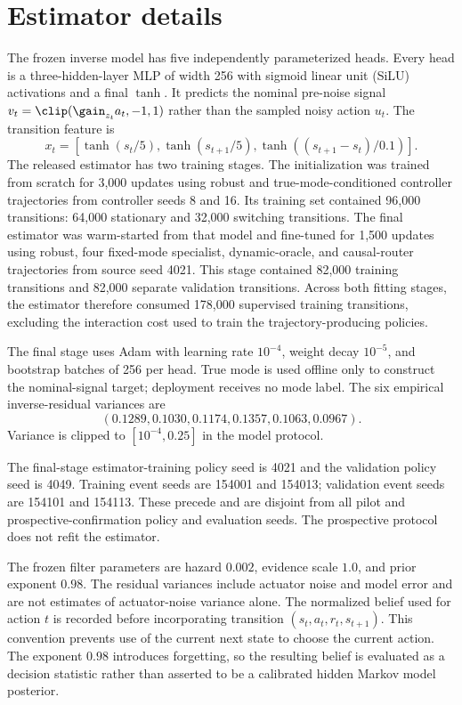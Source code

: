 \section{Estimator details}
\label{app:estimator}

The frozen inverse model has five independently parameterized heads. Every head is a three-hidden-layer MLP of width 256 with sigmoid linear unit (SiLU) activations and a final $\tanh$. It predicts the nominal pre-noise signal $v_t=\clip(\gain_{z_t}a_t,-1,1)$ rather than the sampled noisy action $u_t$. The transition feature is
\begin{equation}
    x_t=\left[
      \tanh(s_t/5),
      \tanh(s_{t+1}/5),
      \tanh((s_{t+1}-s_t)/0.1)
    \right].
\end{equation}
The released estimator has two training stages. The initialization was trained from scratch for 3,000 updates using robust and true-mode-conditioned controller trajectories from controller seeds 8 and 16. Its training set contained 96,000 transitions: 64,000 stationary and 32,000 switching transitions. The final estimator was warm-started from that model and fine-tuned for 1,500 updates using robust, four fixed-mode specialist, dynamic-oracle, and causal-router trajectories from source seed 4021. This stage contained 82,000 training transitions and 82,000 separate validation transitions. Across both fitting stages, the estimator therefore consumed 178,000 supervised training transitions, excluding the interaction cost used to train the trajectory-producing policies.

The final stage uses Adam with learning rate $10^{-4}$, weight decay $10^{-5}$, and bootstrap batches of 256 per head. True mode is used offline only to construct the nominal-signal target; deployment receives no mode label. The six empirical inverse-residual variances are
\begin{equation}
 (0.1289,0.1030,0.1174,0.1357,0.1063,0.0967).
\end{equation}
Variance is clipped to $[10^{-4},0.25]$ in the model protocol.

The final-stage estimator-training policy seed is 4021 and the validation policy seed is 4049. Training event seeds are 154001 and 154013; validation event seeds are 154101 and 154113. These precede and are disjoint from all pilot and prospective-confirmation policy and evaluation seeds. The prospective protocol does not refit the estimator.

The frozen filter parameters are hazard $0.002$, evidence scale $1.0$, and prior exponent $0.98$. The residual variances include actuator noise and model error and are not estimates of actuator-noise variance alone. The normalized belief used for action $t$ is recorded before incorporating transition $(s_t,a_t,r_t,s_{t+1})$. This convention prevents use of the current next state to choose the current action. The exponent $0.98$ introduces forgetting, so the resulting belief is evaluated as a decision statistic rather than asserted to be a calibrated hidden Markov model posterior.

